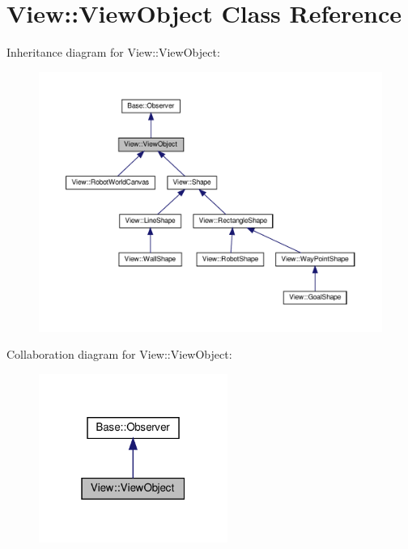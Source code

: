 \hypertarget{class_view_1_1_view_object}{}\section{View\+:\+:View\+Object Class Reference}
\label{class_view_1_1_view_object}


Inheritance diagram for View\+:\+:View\+Object\+:
\nopagebreak
\begin{figure}[H]
\begin{center}
\leavevmode
\includegraphics[width=350pt]{class_view_1_1_view_object__inherit__graph}
\end{center}
\end{figure}


Collaboration diagram for View\+:\+:View\+Object\+:
\nopagebreak
\begin{figure}[H]
\begin{center}
\leavevmode
\includegraphics[width=175pt]{class_view_1_1_view_object__coll__graph}
\end{center}
\end{figure}
